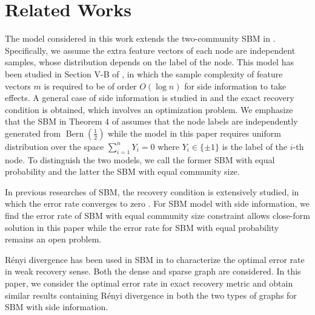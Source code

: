 \documentclass[conference,letterpaper]{IEEEtran}
\DeclareMathOperator{\Bern}{Bern}
\begin{document}
\section{Related Works}\label{s:rw}
The model considered in this work extends the two-community SBM in \cite{abbe2015community}.
Specifically, we assume the extra feature vectors of each node are independent samples, whose distribution depends on the label of the node.
This model has been studied in Section V-B of \cite{saad2018community}, in which the sample complexity of feature vectors
$m$ is required to be of order $O(\log n)$ for side information to take effects.
A general case of side information is studied
in \cite{abbe17sideinfo} and the exact recovery condition is obtained, which involves an optimization problem.
We emphasize that the SBM in Theorem 4 of \cite{abbe17sideinfo}
assumes that the node labels are independently generated  from $\Bern(\frac{1}{2})$ while the model
in this paper requires uniform distribution over the space $\sum_{i=1}^n Y_i = 0$ where $Y_i \in \{\pm 1 \}$ is the label of the $i$-th node.
To distinguish the two models, we call the former SBM with equal probability
and the latter the SBM with equal community size.

In previous researches of SBM, the recovery condition is extensively studied, in which the error rate converges
to zero \cite{abbe2015exact}. 
For SBM model with side information, we find the error rate of SBM with equal community size constraint allows close-form solution 
in this paper while the error rate for SBM with
equal probability remains an open problem.

Rényi divergence has been used in SBM in \cite{zhang2016} to characterize the optimal error rate in weak
recovery sense. Both the dense and sparse graph are considered. In this paper, we consider the optimal error rate in exact recovery metric and obtain similar results containing
Rényi divergence
in both the two types of graphs for SBM with side information.
\end{document}
